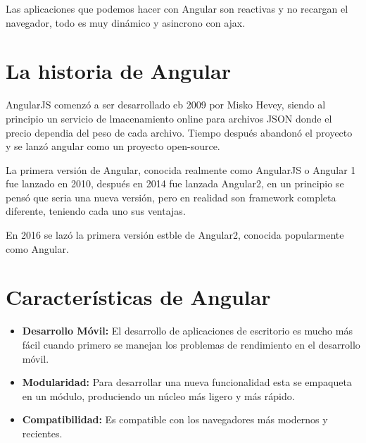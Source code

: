 \documentclass[openany]{book}
\begin{document}
Las aplicaciones que podemos hacer con Angular son reactivas y no recargan el navegador, todo es muy dinámico y asincrono con ajax. 

\section{La historia de Angular}
AngularJS comenzó a ser desarrollado eb 2009 por Misko Hevey, siendo al principio un servicio de lmacenamiento online para archivos JSON donde el precio dependia del peso de cada archivo. Tiempo después abandonó el proyecto y se lanzó angular como un proyecto open-source.

La primera versión de Angular, conocida realmente como AngularJS o Angular 1 fue lanzado en 2010, después en 2014 fue lanzada Angular2, en un principio se pensó que seria una nueva versión, pero en realidad son framework completa diferente, teniendo cada uno sus ventajas. 

En 2016 se lazó la primera versión estble de Angular2, conocida popularmente como Angular. 

\section{Características de Angular}
\begin{itemize}
\item \textbf{Desarrollo Móvil:} El desarrollo de aplicaciones de escritorio es mucho más fácil cuando primero se manejan los problemas de rendimiento en el desarrollo móvil.
\item \textbf{Modularidad:} Para desarrollar una nueva funcionalidad esta se empaqueta en un módulo, produciendo un núcleo más ligero y más rápido.
\item \textbf{Compatibilidad:} Es compatible con los navegadores más modernos y recientes.
\end{itemize}
\end{document}
